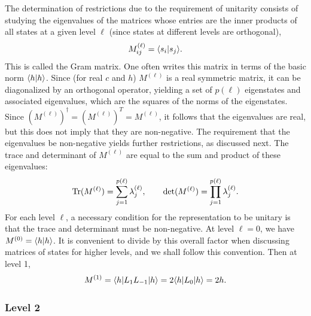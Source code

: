 The determination of restrictions due to the requirement of unitarity consists of studying the eigenvalues of the
matrices whose entries are the inner products of all states at a given level $\ell$ (since states at different levels
are orthogonal),
\begin{equation}
  M_{ij}^{(\ell)} = \langle s_i\vert s_j\rangle .
\end{equation}
This is called the Gram matrix. One often writes this matrix in terms of the basic norm $\langle h\vert h\rangle$. Since (for
real $c$ and $h$) $M^{(\ell)}$ is a real symmetric matrix, it can be diagonalized by an orthogonal operator, yielding a
set of $p(\ell)$ eigenstates and associated eigenvalues, which are the squares of the norms of the eigenstates. Since
$(M^{(\ell)})^\dagger = (M^{(\ell)})^T = M^{(\ell)}$, it follows that the eigenvalues are real,
but this does not imply that they are non-negative. The requirement that the eigenvalues be non-negative yields further
restrictions, as discussed next. The trace and determinant of $M^{(\ell)}$ are equal to the sum and product of these
eigenvalues:
\begin{equation}
  \operatorname{Tr}(M^{(\ell)}) = \sum_{j=1}^{p(\ell)}\lambda_j^{(\ell)} , \qquad
  \det(M^{(\ell)}) = \prod_{j=1}^{p(\ell)}\lambda_j^{(\ell)} .
\end{equation}
For each level $\ell$, a necessary condition for the representation to be unitary is that the trace and determinant
must be non-negative. At level $\ell = 0$, we have $M^{(0)} = \langle h\vert h\rangle$. It is convenient to divide by this
overall factor when discussing matrices of states for higher levels, and we shall follow this convention. Then at
level 1,
\begin{equation}
  M^{(1)} = \langle h\rvert L_1L_{-1}\lvert h\rangle = 2\langle h\rvert L_0\lvert h\rangle = 2h .
\end{equation}

\subsubsection*{Level 2}

